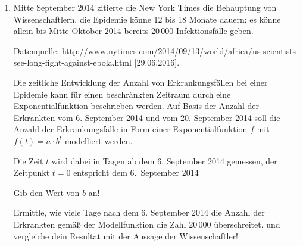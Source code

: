 \begin{langesbeispiel}
\begin{enumerate}
	\item  Mitte September 2014 zitierte die New York Times die Behauptung von Wissenschaftlern, die Epidemie könne 12 bis 18 Monate dauern; es könne allein bis Mitte Oktober 2014 bereits 20\,000 Infektionsfälle geben.
	
	\begin{scriptsize}\begin{singlespace}Datenquelle: http://www.nytimes.com/2014/09/13/world/africa/us-scientists-see-long-fight-against-ebola.html [29.06.2016].\end{singlespace}\end{scriptsize}
	
	Die zeitliche Entwicklung der Anzahl von Erkrankungsfällen bei einer Epidemie kann für einen beschränkten Zeitraum durch eine Exponentialfunktion beschrieben werden. Auf Basis der Anzahl der Erkrankten vom 6. September 2014 und vom 20. September 2014 soll die Anzahl der Erkrankungsfälle in Form einer Exponentialfunktion $f$ mit $f(t)=a\cdot b^t$ modelliert werden. 
	
	Die Zeit $t$ wird dabei in Tagen ab dem 6. September 2014 gemessen, der Zeitpunkt $t=0$ entspricht dem 6. September 2014
	
	 Gib den Wert von $b$ an!
	
	Ermittle, wie viele Tage nach dem 6. September 2014 die Anzahl der Erkrankten gemäß der Modellfunktion die Zahl 20\,000 überschreitet, und vergleiche dein Resultat mit der Aussage der Wissenschaftler!  
	
\end{enumerate}
\end{langesbeispiel}
